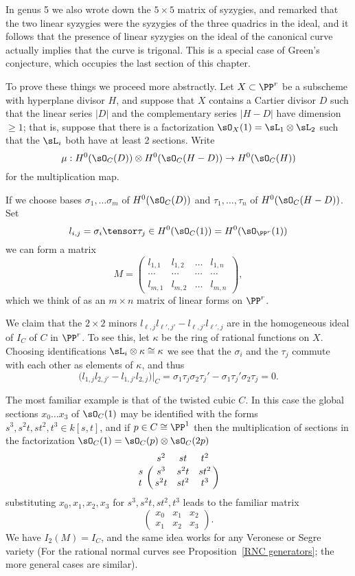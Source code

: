 In genus 5 we also wrote down the $5\times 5$ matrix
of syzygies, and remarked that the two linear syzygies were the syzygies of the three quadrics in the ideal,
and it follows that the presence of linear syzygies on the ideal of the canonical curve actually implies
that the curve is trigonal. This is a special case of Green's conjecture, which occupies the last section of
this chapter.

To prove these things we proceed more abstractly. Let $X\subset \PP^r$ be a subscheme
with hyperplane divisor $H$, and suppose that $X$
contains a Cartier divisor $D$ such that the linear series $|D|$ and the complementary series
$|H-D|$ have dimension $\geq 1$; that is, suppose that there is a factorization
$\sO_X(1) = \sL_1\otimes \sL_2$ such that the $\sL_i$ both have at least 2 sections. Write
$$
\mu: H^0(\sO_C(D)) \otimes H^0(\sO_C(H-D)) \to H^0(\sO_C(H))
$$
for the multiplication map.

If we choose bases
$\sigma_1,  \dots \sigma_m$ of  $H^0(\sO_C(D))$ and $\tau_1,\dots, \tau_n$ of $H^0(\sO_C(H-D))$. Set
$$
l_{i,j}= \sigma_i\tensor \tau_j \in H^0(\sO_C(1)) = H^0(\sO_{\PP^r}(1))
$$ 
we can form a matrix 
$$
M = 
\begin{pmatrix}
 l_{1,1}&l_{1,2}&\dots&l_{1,n}\\
 \cdots&\cdots&\cdots&\cdots\\
  l_{m,1}&l_{m,2}&\dots&l_{m,n}
\end{pmatrix},
$$
which we think of as an $m\times n$ matrix of linear forms on $\PP^r$.

We claim that  the $2\times 2$ minors $l_{\ell,j} l_{\ell',j'}-l_{\ell,j'} l_{\ell',j}$ are in the homogeneous ideal of $I_C$ of $C$ in $\PP^r$. 
To see this,
let $\kappa$ be the ring of rational functions on $X$. Choosing identifications $\sL_i\otimes \kappa  \cong \kappa $ we see that the $\sigma_i$ and the $\tau_j$ commute with each other as elements of $\kappa$, and thus 
$$
\bigl(l_{1,j} l_{2,j'}-l_{1,j'}l_{2,j}\bigr)|_C = \sigma_1\tau_j\sigma_2\tau_j' - \sigma_1\tau_j'\sigma_2\tau_j =0.
$$

\begin{example}
The most familiar example is that of the twisted cubic $C$. In this case the global sections $x_0\dots x_3$ of $\sO_C(1)$ may be identified with the forms $s^3, s^2t, st^2, t^3 \in k[s,t]$, and if $p\in C \cong \PP^1$ then the multiplication of sections
in the factorization  $\sO_C(1) = \sO_C(p) \otimes \sO_C(2p)$ 
$$
\bordermatrix{
 &s^2&st&t^2\cr
 s& s^3&s^2t&st^2\cr
 t& s^2t&st^2&t^3
}
$$
substituting $x_0,x_1,x_2, x_3$ for $s^3,s^2t,st^2,t^3$ leads to the familiar matrix
$$
\begin{pmatrix}
x_0&x_1&x_2\\
x_1&x_2&x_3 
\end{pmatrix}.
$$
We have $I_2(M) = I_C$, and the same idea works for any Veronese or Segre variety (For the rational normal curves see Proposition~\ref{RNC generators}; the more general cases are similar).
\end{example}

